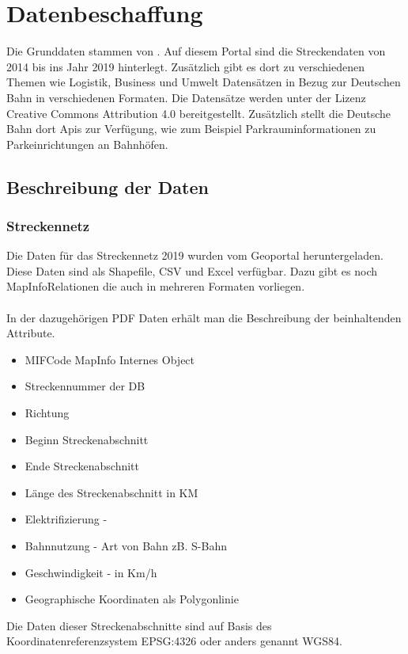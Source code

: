 \section{Datenbeschaffung}
Die Grunddaten stammen von \cite{dbgeodaten}. Auf diesem Portal sind die Streckendaten von 2014 bis ins Jahr 2019 hinterlegt. Zusätzlich gibt es dort zu verschiedenen Themen wie Logistik, Business und Umwelt Datensätzen in Bezug zur Deutschen Bahn in verschiedenen Formaten. Die Datensätze werden unter der Lizenz Creative Commons Attribution 4.0 bereitgestellt.
Zusätzlich stellt die Deutsche Bahn dort Apis zur Verfügung, wie zum Beispiel Parkrauminformationen zu Parkeinrichtungen an Bahnhöfen.
\subsection{Beschreibung der Daten}
\subsubsection{Streckennetz}
Die Daten für das Streckennetz 2019 wurden vom Geoportal heruntergeladen. \cite{dbgeodaten}
Diese Daten sind als Shapefile, CSV und Excel verfügbar. Dazu gibt es noch MapInfoRelationen die auch in mehreren Formaten vorliegen.
\\\\
In der dazugehörigen PDF Daten erhält man die Beschreibung der beinhaltenden Attribute.
\begin{itemize}
	\item MIFCode MapInfo Internes Object
	\item Streckennummer der DB
	\item Richtung 
	\item Beginn Streckenabschnitt
	\item Ende Streckenabschnitt
	\item Länge des Streckenabschnitt in KM
	\item Elektrifizierung - 
	\item Bahnnutzung - Art von Bahn zB. S-Bahn
	\item Geschwindigkeit - in Km/h
	\item Geographische Koordinaten als Polygonlinie
\end{itemize}
Die Daten dieser Streckenabschnitte sind auf Basis des Koordinatenreferenzsystem EPSG:4326 oder anders genannt WGS84.
